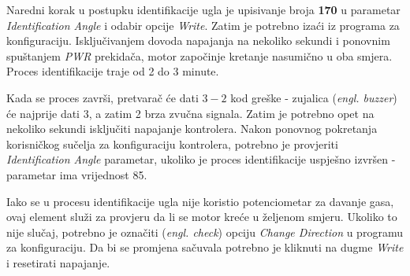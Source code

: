 Naredni korak u postupku identifikacije ugla je upisivanje broja \textbf{170} u parametar \textit{Identification Angle} i odabir opcije \textit{Write}. Zatim je potrebno izaći iz programa za konfiguraciju. Isključivanjem dovoda napajanja na nekoliko sekundi i ponovnim spuštanjem \textit{PWR} prekidača, motor započinje kretanje nasumično u oba smjera. Proces identifikacije traje od 2 do 3 minute.

Kada se proces završi, pretvarač će dati $3-2$ kod greške - zujalica (\textit{engl. buzzer}) će najprije dati 3, a zatim 2 brza zvučna signala. Zatim je potrebno opet na nekoliko sekundi isključiti napajanje kontrolera. Nakon ponovnog pokretanja korisničkog sučelja za konfiguraciju kontrolera, potrebno je provjeriti \textit{Identification Angle} parametar, ukoliko je proces identifikacije uspješno izvršen - parametar ima vrijednost 85.

Iako se u procesu identifikacije ugla nije koristio potenciometar za davanje gasa, ovaj element služi za provjeru da li se motor kreće u željenom smjeru. Ukoliko to nije slučaj, potrebno je označiti (\textit{engl. check}) opciju \textit{Change Direction} u programu za konfiguraciju. Da bi se promjena sačuvala potrebno je kliknuti na dugme \textit{Write} i resetirati napajanje.


